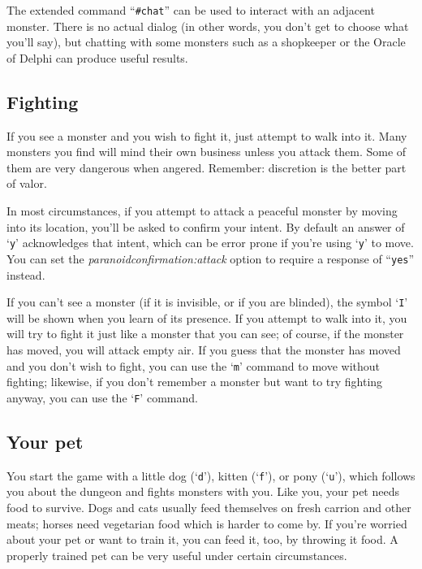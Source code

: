 \documentclass[titlepage]{article}
\begin{document}
The extended command ``\texttt{\#chat}'' can be used to interact with an adjacent
monster.  There is no actual dialog (in other words, you don't get to
choose what you'll say), but chatting with some monsters such as a
shopkeeper or the Oracle of Delphi can produce useful results.

\subsection*{Fighting}

If you see a monster and you wish to fight it, just attempt to walk
into it.  Many monsters you find will mind their own business unless
you attack them.  Some of them are very dangerous when angered.
Remember:  discretion is the better part of valor.

In most circumstances, if you attempt to attack a peaceful monster by
moving into its location, you'll be asked to confirm your intent.  By
default an answer of `\texttt{y}' acknowledges that intent,
which can be error prone if you're using `\texttt{y}' to move.  You can set the
\textit{paranoid\textunderscore confirmation:attack}
option to require a response of ``\texttt{yes}'' instead.

If you can't see a monster (if it is invisible, or if you are blinded),
the symbol `\texttt{I}' will be shown when you learn of its presence.
If you attempt to walk into it, you will try to fight it just like
a monster that you can see; of course,
if the monster has moved, you will attack empty air.  If you guess
that the monster has moved and you don't wish to fight, you can use the
`\texttt{m}' command to move without fighting; likewise, if you don't remember
a monster but want to try fighting anyway, you can use the `\texttt{F}' command.

\subsection*{Your pet}

You start the game with a little dog (`\texttt{d}'), kitten (`\texttt{f}'),
or pony (`\texttt{u}'), which follows
you about the dungeon and fights monsters with you.
Like you, your pet needs food to survive.
Dogs and cats usually feed themselves on fresh carrion and other meats;
horses need vegetarian food which is harder to come by.
If you're worried about your pet or want to train it, you
can feed it, too, by throwing it food.
A properly trained pet can be very useful under certain circumstances.
\end{document}
